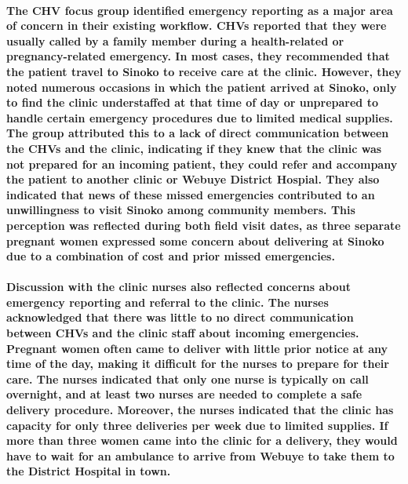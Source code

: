 \paragraph{The CHV focus group identified emergency reporting as a major area of concern in their existing workflow. CHVs reported that they were usually called by a family member during a health-related or pregnancy-related emergency. In most cases, they recommended that the patient travel to Sinoko to receive care at the clinic. However, they noted numerous occasions in which the patient arrived at Sinoko, only to find the clinic understaffed at that time of day or unprepared to handle certain emergency procedures due to limited medical supplies. The group attributed this to a lack of direct communication between the CHVs and the clinic, indicating if they knew that the clinic was not prepared for an incoming patient, they could refer and accompany the patient to another clinic or Webuye District Hospial. They also indicated that news of these missed emergencies contributed to an unwillingness to visit Sinoko among community members. This perception was reflected during both field visit dates, as three separate pregnant women expressed some concern about delivering at Sinoko due to a combination of cost and prior missed emergencies.}

\paragraph{Discussion with the clinic nurses also reflected concerns about emergency reporting and referral to the clinic. The nurses acknowledged that there was little to no direct communication between CHVs and the clinic staff about incoming emergencies. Pregnant women often came to deliver with little prior notice at any time of the day, making it difficult for the nurses to prepare for their care. The nurses indicated that only one nurse is typically on call overnight, and at least two nurses are needed to complete a safe delivery procedure. Moreover, the nurses indicated that the clinic has capacity for only three deliveries per week due to limited supplies. If more than three women came into the clinic for a delivery, they would have to wait for an ambulance to arrive from Webuye to take them to the District Hospital in town.}

